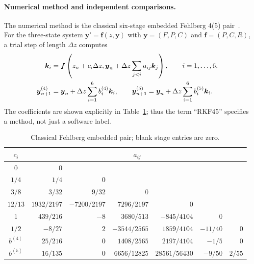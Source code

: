 \paragraph{Numerical method and independent comparisons.}
The numerical method is the classical six-stage embedded Fehlberg
4(5) pair~\cite{uddin2016rkf}. For the three-state system
$\boldsymbol y'=\boldsymbol f(z,\boldsymbol y)$ with
$\boldsymbol y=(F,P,C)$ and $\boldsymbol f=(P,C,R)$, a trial step
of length $\Delta z$ computes
\begin{align}
 \boldsymbol k_i&=\boldsymbol f\left(z_n+c_i\Delta z,
       \boldsymbol y_n+\Delta z\sum_{j<i}a_{ij}\boldsymbol k_j\right),
             \qquad i=1,\ldots,6,\notag\\
 \boldsymbol y_{n+1}^{(4)}&=\boldsymbol y_n+
                  \Delta z\sum_{i=1}^6b_i^{(4)}\boldsymbol k_i,\qquad
 \boldsymbol y_{n+1}^{(5)}=\boldsymbol y_n+
                  \Delta z\sum_{i=1}^6b_i^{(5)}\boldsymbol k_i.
 \label{eq:sve-rkf-step}
\end{align}
The coefficients are shown explicitly in Table~\ref{tab:sve-rkf-tableau};
thus the term ``RKF45'' specifies a method, not just a software label.
\begin{table}[htbp]
\centering\small
\begin{tabular}{@{}c|rrrrrr@{}}
\toprule
$c_i$ & \multicolumn{6}{c}{$a_{ij}$}\\
\midrule
$0$ & $0$ & & & & &\\
$1/4$ & $1/4$ & $0$ & & & &\\
$3/8$ & $3/32$ & $9/32$ & $0$ & & &\\
$12/13$ & $1932/2197$ & $-7200/2197$ & $7296/2197$ & $0$ & &\\
$1$ & $439/216$ & $-8$ & $3680/513$ & $-845/4104$ & $0$ &\\
$1/2$ & $-8/27$ & $2$ & $-3544/2565$ & $1859/4104$ & $-11/40$ & $0$\\
\midrule
$b^{(4)}$ & $25/216$ & $0$ & $1408/2565$ & $2197/4104$ & $-1/5$ & $0$\\
$b^{(5)}$ & $16/135$ & $0$ & $6656/12825$ & $28561/56430$ & $-9/50$ & $2/55$\\
\bottomrule
\end{tabular}
\caption{Classical Fehlberg embedded pair; blank stage entries are zero.}
\label{tab:sve-rkf-tableau}
\end{table}

